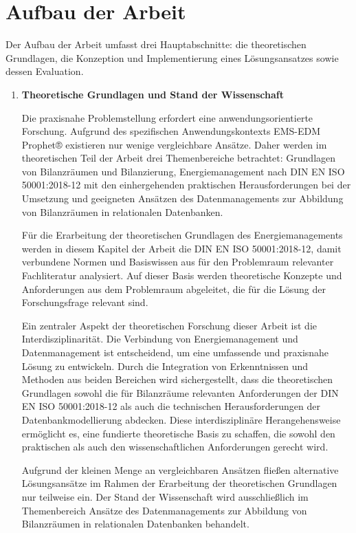 \section{Aufbau der Arbeit}
Der Aufbau der Arbeit umfasst drei Hauptabschnitte: die theoretischen Grundlagen, die Konzeption und Implementierung eines Lösungsansatzes sowie dessen 
Evaluation.
\begin{enumerate}
    \item \textbf{Theoretische Grundlagen und Stand der Wissenschaft}
    
    Die praxisnahe Problemstellung erfordert eine anwendungsorientierte Forschung. 
    Aufgrund des spezifischen Anwendungskontexts EMS-EDM Prophet® existieren nur wenige vergleichbare Ansätze.
    Daher werden im theoretischen Teil der Arbeit drei Themenbereiche betrachtet: Grundlagen von Bilanzräumen und Bilanzierung, Energiemanagement nach
    DIN EN ISO 50001:2018-12 mit den einhergehenden praktischen Herausforderungen bei der Umsetzung und geeigneten Ansätzen des Datenmanagements zur Abbildung
    von Bilanzräumen in relationalen Datenbanken.
    
    Für die Erarbeitung der theoretischen Grundlagen des Energiemanagements werden in diesem Kapitel der Arbeit die DIN EN ISO 50001:2018-12, damit verbundene Normen und
    Basiswissen aus für den Problemraum relevanter Fachliteratur analysiert. Auf dieser Basis werden theoretische Konzepte und Anforderungen aus dem
    Problemraum abgeleitet, die für die Lösung der Forschungsfrage relevant sind.
    
    Ein zentraler Aspekt der theoretischen Forschung dieser Arbeit ist die Interdisziplinarität. Die Verbindung von Energiemanagement und Datenmanagement
    ist entscheidend, um eine umfassende und praxisnahe Lösung zu entwickeln. Durch die Integration von Erkenntnissen und Methoden aus beiden Bereichen
    wird sichergestellt, dass die theoretischen Grundlagen sowohl die für Bilanzräume relevanten Anforderungen der DIN EN ISO 50001:2018-12 als auch die technischen
    Herausforderungen der Datenbankmodellierung abdecken. Diese interdisziplinäre Herangehensweise ermöglicht es, eine fundierte theoretische Basis zu
    schaffen, die sowohl den praktischen als auch den wissenschaftlichen Anforderungen gerecht wird.
    
    Aufgrund der kleinen Menge an vergleichbaren Ansätzen fließen alternative Lösungsansätze im Rahmen der Erarbeitung der theoretischen Grundlagen nur teilweise ein.
    Der Stand der Wissenschaft wird ausschließlich im Themenbereich Ansätze des Datenmanagements zur Abbildung von Bilanzräumen in relationalen
    Datenbanken behandelt.  


\end{enumerate}
